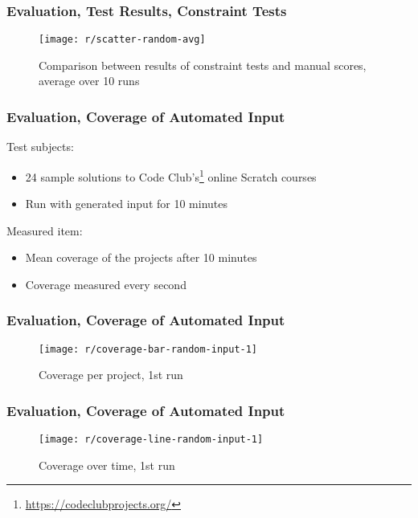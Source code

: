 \begin{frame}\frametitle{Evaluation, Test Results, Constraint Tests}
    \begin{figure}
        \begin{minipage}{.85\textwidth}
            \texttt{[image: r/scatter-random-avg]}
            \caption{Comparison between results of constraint tests and manual scores, average over 10 runs}
        \end{minipage}
    \end{figure}
\end{frame}

\begin{frame}
\end{frame}

\begin{frame}\frametitle{Evaluation, Coverage of Automated Input}
    Test subjects:
    \begin{itemize}
        \item 24 sample solutions to Code Club's\footnote{\url{https://codeclubprojects.org/}} online Scratch courses
        \item Run with generated input for 10 minutes
    \end{itemize}

    \pause
    \bigskip

    Measured item:
    \begin{itemize}
        \item Mean coverage of the projects after 10 minutes
        \item Coverage measured every second
    \end{itemize}
\end{frame}

\begin{frame}\frametitle{Evaluation, Coverage of Automated Input}
    \begin{figure}
        \texttt{[image: r/coverage-bar-random-input-1]}
        \caption{Coverage per project, 1st run}
    \end{figure}
\end{frame}

\begin{frame}\frametitle{Evaluation, Coverage of Automated Input}
    \begin{figure}
        \texttt{[image: r/coverage-line-random-input-1]}
        \caption{Coverage over time, 1st run}
    \end{figure}
\end{frame}

